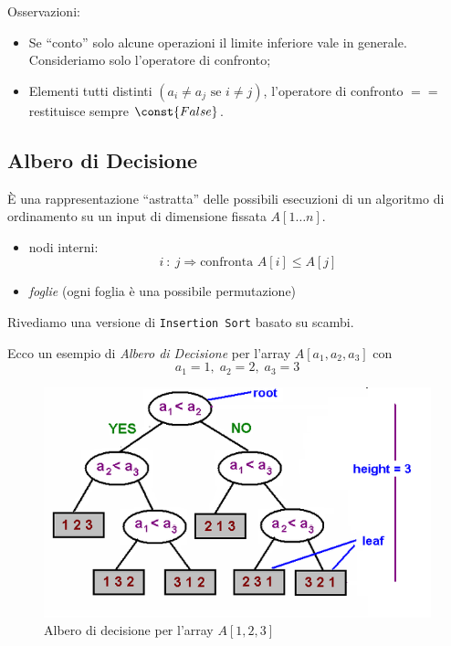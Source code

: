 Osservazioni:
\begin{itemize}[label=$\rightarrow$]
    \item Se ``conto'' solo alcune operazioni il limite inferiore
    vale in generale. Consideriamo solo l'operatore di confronto;
    \item Elementi tutti distinti $(a_i \neq a_j \text{ se } i \neq j)$,
    l'operatore di confronto $==$ restituisce sempre $\const{False}$.
\end{itemize}

\subsection{Albero di Decisione}

È una rappresentazione ``astratta'' delle possibili esecuzioni di un 
algoritmo di ordinamento su un input di dimensione fissata $A[1 \dots n]$.

\begin{itemize}[label=$\rightarrow$]
    \item nodi interni: 
    $$i \ : \ j \Rightarrow \text{confronta } A[i] \leq A[j]$$
    \item \emph{foglie} (ogni foglia è una possibile permutazione)
\end{itemize}

Rivediamo una versione di \texttt{Insertion Sort} basato su scambi.

\clearpage
Ecco un esempio di \emph{Albero di Decisione} per l'array $A[a_1,a_2,a_3]$ 
con 
$$a_1 = 1, \; a_2 = 2, \; a_3 = 3$$
\begin{figure}[!hb] 
    \centering
    \includegraphics[width=\textwidth]{img/decision-tree.png}
    \caption{Albero di decisione per l'array $A[1,2,3]$}
\end{figure}

